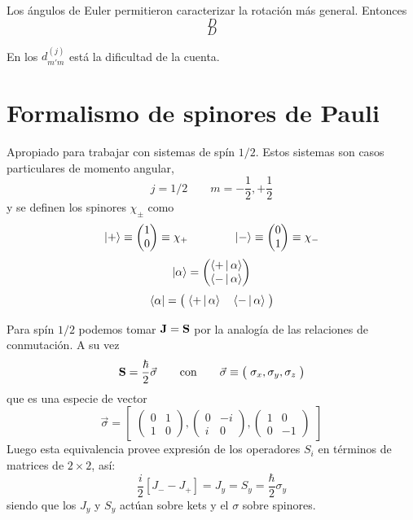 \documentclass[10pt,oneside]{CBFT_book}
\begin{document}
Los ángulos de Euler permitieron caracterizar la rotación más general. Entonces 
\[
	D
\]
\[
	D
\]

En los $d_{m'm}^{(j)}$ está la dificultad de la cuenta.

\section{Formalismo de spinores de Pauli}

Apropiado para trabajar con sistemas de spín $1/2$. Estos sistemas son casos particulares de momento angular,
\[
	j = 1/2 \qquad m=-\frac{1}{2},+\frac{1}{2}
\]
y se definen los spinores $\chi_\pm$ como
\[
	\Ket{+} \equiv  \begin{pmatrix} 1 \\ 0  \end{pmatrix} \equiv  \chi_+ \qquad \qquad
	\Ket{-} \equiv  \begin{pmatrix} 0 \\ 1  \end{pmatrix} \equiv  \chi_-
\]
\[
	\Ket{\alpha} = \begin{pmatrix}   \Braket{+|\alpha} \\ \Braket{-|\alpha}  \end{pmatrix}
\]
\[
	\Bra{\alpha} = \begin{pmatrix}  \; \Braket{+|\alpha} \quad \Braket{-|\alpha} \;  \end{pmatrix}
\]

Para spín $1/2$ podemos tomar $\vb{J} = \vb{S}$ por la analogía de las relaciones de conmutación.
A su vez 
\[
	\vb{S} = \frac{\hbar}{2} \vec{\sigma} \qquad \text{con} \qquad \vec{\sigma} \equiv 
	\begin{pmatrix} \; \sigma_x, \sigma_y, \sigma_z \; \end{pmatrix}
\]
que es una especie de vector 
\[
	\vec{\sigma}  =
	\begin{bmatrix}
	 \begin{pmatrix} 0 & 1 \\ 1 & 0 \end{pmatrix}, \begin{pmatrix} 0 & -i \\ i & 0 \end{pmatrix},
	 \begin{pmatrix} 1 & 0 \\ 0 & -1 \end{pmatrix} 
	\end{bmatrix}
\]
Luego esta equivalencia provee expresión de los operadores $S_i$ en términos de matrices de $2\times 2$, así:
\[
	\frac{i}{2}[ J_- - J_+] = J_y = S_y = \frac{\hbar}{2} \sigma_y
\]
siendo que los $J_y$ y $S_y$ actúan sobre kets y el $\sigma$ sobre spinores.
\end{document}
